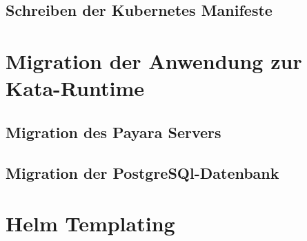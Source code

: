 \subsection{Schreiben der Kubernetes Manifeste}



\section{Migration der Anwendung zur Kata-Runtime}


\subsection{Migration des Payara Servers}


\subsection{Migration der PostgreSQl-Datenbank}


\section{Helm Templating}